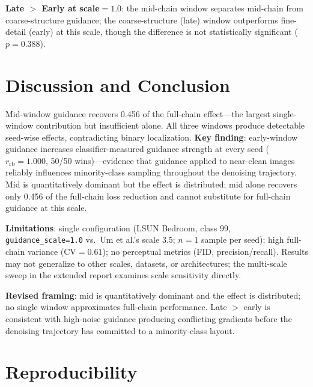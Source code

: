 \documentclass[10pt]{article}
\begin{document}
\noindent\textbf{Late $>$ Early at scale$=1.0$}: the mid-chain window separates
mid-chain from coarse-structure guidance; the coarse-structure (late) window
outperforms fine-detail (early) at this scale, though the difference is not
statistically significant ($p = 0.388$).

\section{Discussion and Conclusion}
\label{sec:discussion}

Mid-window guidance recovers 0.456 of the full-chain effect---the largest
single-window contribution but insufficient alone.  All three windows produce
detectable seed-wise effects, contradicting binary localization.
\textbf{Key finding}: early-window guidance increases classifier-measured
guidance strength at every seed ($r_\mathrm{rb} = 1.000$, 50/50 wins)---evidence
that guidance applied to near-clean images reliably influences minority-class
sampling throughout the denoising trajectory.  Mid is quantitatively dominant
but the effect is distributed; mid alone recovers only 0.456 of the full-chain
loss reduction and cannot substitute for full-chain guidance at this scale.

\textbf{Limitations}: single configuration (LSUN Bedroom, class 99,
\texttt{guidance\_scale=1.0} vs.\ Um et al.'s scale $3.5$; $n=1$ sample per
seed); high full-chain variance (CV$=0.61$); no perceptual metrics (FID,
precision/recall).  Results may not generalize to other scales, datasets, or
architectures; the multi-scale sweep in the extended report examines scale
sensitivity directly.

\textbf{Revised framing}: mid is quantitatively dominant and the effect is
distributed; no single window approximates full-chain performance.  Late $>$
early is consistent with high-noise guidance producing conflicting gradients
before the denoising trajectory has committed to a minority-class layout.




\appendix
\section{Reproducibility}
\label{sec:reproducibility}
\end{document}
